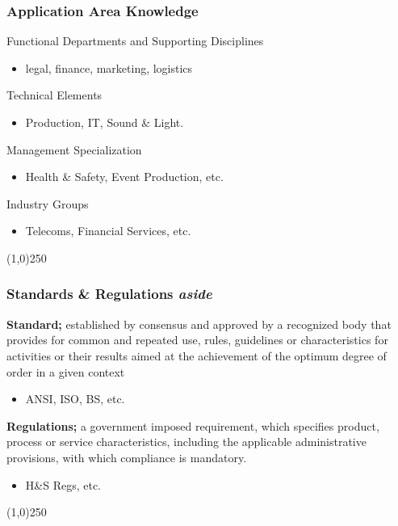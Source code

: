\begin{frame}
\frametitle{Application Area Knowledge}
Functional Departments and Supporting Disciplines \\
	\begin{itemize}
	\item legal, finance, marketing, logistics
	\end{itemize}
Technical Elements \\
	\begin{itemize}
	\item Production, IT, Sound \& Light.
	\end{itemize}
Management Specialization \\
	\begin{itemize}
	\item Health \& Safety, Event Production, etc.
	\end{itemize}
Industry Groups \\
	\begin{itemize}
	\item Telecoms, Financial Services, etc.
	\end{itemize}
\end{frame}
\begin{center}\line(1,0){250}\end{center}



\begin{frame}
\frametitle{Standards \& Regulations \hfill \textit{aside}}
\textbf{Standard;} established by consensus and approved by a recognized body that provides for common and repeated use, rules, guidelines or characteristics for activities or their results aimed at the achievement of the optimum degree of order in a given context\\
\begin{itemize}
\item ANSI, ISO, BS, etc.
\end{itemize}

\textbf{Regulations;} a government imposed requirement, which specifies product, process or service characteristics, including the applicable administrative provisions, with which compliance is mandatory.\\
\begin{itemize}
\item H\&S Regs, etc. 
\end{itemize}
\end{frame}
\begin{center}\line(1,0){250}\end{center}


